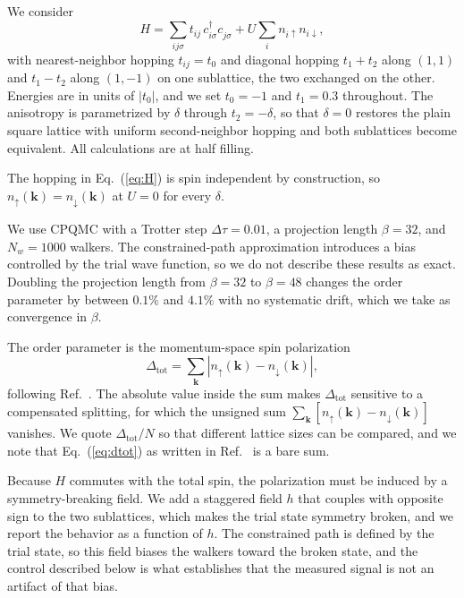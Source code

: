 \documentclass[aps,prb,reprint,superscriptaddress,amsmath,amssymb,floatfix]{revtex4-2}
\begin{document}
We consider
\begin{equation}
H = \sum_{ij\sigma} t_{ij}\, c^{\dagger}_{i\sigma} c^{\phantom{\dagger}}_{j\sigma}
    + U \sum_i n_{i\uparrow} n_{i\downarrow},
\label{eq:H}
\end{equation}
with nearest-neighbor hopping $t_{ij} = t_0$ and diagonal hopping
$t_1 + t_2$ along $(1,1)$ and $t_1 - t_2$ along $(1,-1)$ on one sublattice, the
two exchanged on the other. Energies are in units of $|t_0|$, and we set
$t_0 = -1$ and $t_1 = 0.3$ throughout. The anisotropy is parametrized by
$\delta$ through $t_2 = -\delta$, so that $\delta = 0$ restores the plain square
lattice with uniform second-neighbor hopping and both sublattices become
equivalent. All calculations are at half filling.

The hopping in Eq.~(\ref{eq:H}) is spin independent by construction, so
$n_{\uparrow}(\bm{k}) = n_{\downarrow}(\bm{k})$ at $U = 0$ for every $\delta$.

We use CPQMC with a Trotter step $\Delta\tau = 0.01$, a projection length
$\beta = 32$, and $N_w = 1000$ walkers. The constrained-path approximation
introduces a bias controlled by the trial wave function, so we do not describe
these results as exact. Doubling the projection length from $\beta = 32$ to
$\beta = 48$ changes the order parameter by between $0.1\%$ and $4.1\%$ with no
systematic drift, which we take as convergence in $\beta$.

The order parameter is the momentum-space spin polarization
\begin{equation}
\Delta_{\mathrm{tot}} = \sum_{\bm{k}} \left| n_{\uparrow}(\bm{k}) - n_{\downarrow}(\bm{k}) \right|,
\label{eq:dtot}
\end{equation}
following Ref.~\cite{OurPRB}. The absolute value inside the sum makes
$\Delta_{\mathrm{tot}}$ sensitive to a compensated splitting, for which the
unsigned sum $\sum_{\bm{k}} [n_{\uparrow}(\bm{k}) - n_{\downarrow}(\bm{k})]$
vanishes. We quote $\Delta_{\mathrm{tot}}/N$ so that different lattice sizes can
be compared, and we note that Eq.~(\ref{eq:dtot}) as written in
Ref.~\cite{OurPRB} is a bare sum.

Because $H$ commutes with the total spin, the polarization must be induced by a
symmetry-breaking field. We add a staggered field $h$ that couples with opposite
sign to the two sublattices, which makes the trial state symmetry broken, and we
report the behavior as a function of $h$. The constrained path is defined by the
trial state, so this field biases the walkers toward the broken state, and the
control described below is what establishes that the measured signal is not an
artifact of that bias.
\end{document}
